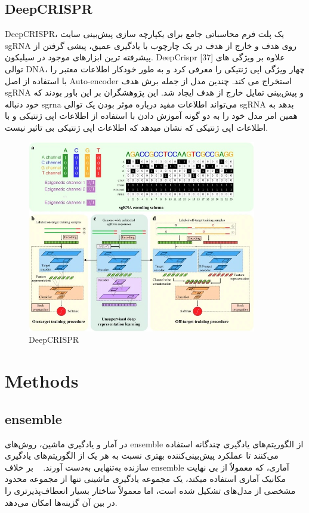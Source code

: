 \documentclass[12pt,a4paper,BCOR=.7cm,headsepline,bibliography=totoc]{report}
\begin{document}
\section{DeepCRISPR~\cite{DeepCRISPR}}
DeepCRISPR، 
یک پلت فرم محاسباتی جامع برای یکپارچه سازی پیش‌بینی سایت sgRNA روی هدف و خارج از هدف در یک چارچوب با یادگیری عمیق، پیشی گرفتن از پیشرفته ترین ابزارهای موجود در سیلیکون. DeepCrispr [37] علاوه بر ویژگی های توالی DNA، چهار ویژگی اپی ژنتیکی را معرفی کرد و به طور خودکار اطلاعات معتبر را با استفاده از اصل Auto-encoder استخراج می کند. چندین مدل از جمله برش هدف sgRNA و پیش‌بینی تمایل خارج از هدف ایجاد شد. این پژوهشگران بر این باور بودند که خود دنباله sgrna می‌تواند اطلاعات مفید درباره موثر بودن یک توالی sgRNA بدهد به همین امر مدل خود را به دو گونه آموزش دادن با استفاده از اطلاعات اپی ژنتیکی و با اطلاعات اپی ژنتیکی که نشان میدهد که اطلاعات اپی ژنتیکی بی تاثیر نیست. 
\begin{figure}[H]
\centering
\includegraphics[width=10cm, ]{pictures/DeepCRISPR.jpg}
\caption{
DeepCRISPR
}\label{wrap-fig:4}
\end{figure}


\chapter{Methods}
\section{ensemble}
در آمار و یادگیری ماشین، روش‌های ensemble از الگوریتم‌های یادگیری چندگانه استفاده می‌کنند تا عملکرد پیش‌بینی‌کننده بهتری نسبت به هر یک از الگوریتم‌های یادگیری سازنده به‌تنهایی به‌دست آورند. ~\cite{Opitz, Polikar, Rokach} بر خلاف ensemble آماری، که معمولاً از بی نهایت مکانیک آماری استفاده میکند، یک مجموعه یادگیری ماشینی تنها از مجموعه محدود مشخصی از مدل‌های تشکیل شده است، اما معمولاً ساختار بسیار انعطاف‌پذیرتری را در بین آن گزینه‌ها امکان می‌دهد.
\end{document}
